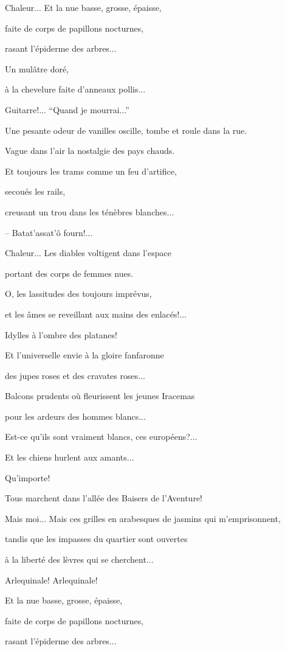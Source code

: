 Chaleur... Et la nue basse, grosse, épaisse,

faite de corps de papillons nocturnes,

rasant l'épiderme des arbres...

Un mulâtre doré,

à la chevelure faite d'anneaux pollis...

Guitarre!... ``Quand je mourrai...''

Une pesante odeur de vanilles oscille, tombe et roule dans la rue.

Vague dans l'air la nostalgie des pays chauds.

Et toujours les trams comme un feu d'artifice,

secoués les rails,

creusant un trou dans les ténèbres blanches...

-- Batat'assat'ô fourn!...

Chaleur... Les diables voltigent dans l'espace

portant des corps de femmes nues.

O, les lassitudes des toujours imprévus,

et les âmes se reveillant aux mains des enlacés!...

Idylles à l'ombre des platanes!

Et l'universelle envie à la gloire fanfaronne

des jupes roses et des cravates roses...

Balcons prudents où fleurissent les jeunes Iracemas

pour les ardeurs des hommes blancs...

Est-ce qu'ils sont vraiment blancs, ces européens?...

Et les chiens hurlent aux amants...

Qu'importe!

Tous marchent dans l'allée des Baisers de l'Aventure!

Mais moi... Mais ces grilles en arabesques de jasmins qui
m'emprisonnent,

tandis que les impasses du quartier sont ouvertes

à la liberté des lèvres qui se cherchent...

Arlequinale! Arlequinale!

Et la nue basse, grosse, épaisse,

faite de corps de papillons nocturnes,

rasant l'épiderme des arbres...

